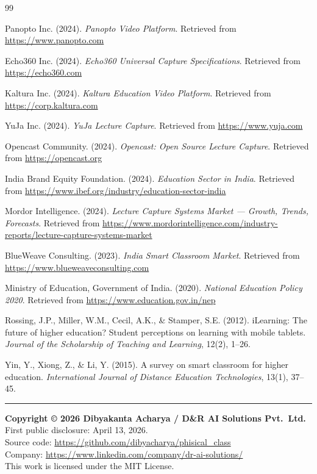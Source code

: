 \documentclass[12pt,a4paper]{article}
\begin{document}
\begin{thebibliography}{99}

Panopto Inc. (2024). \textit{Panopto Video Platform}. Retrieved from \url{https://www.panopto.com}

Echo360 Inc. (2024). \textit{Echo360 Universal Capture Specifications}. Retrieved from \url{https://echo360.com}

Kaltura Inc. (2024). \textit{Kaltura Education Video Platform}. Retrieved from \url{https://corp.kaltura.com}

YuJa Inc. (2024). \textit{YuJa Lecture Capture}. Retrieved from \url{https://www.yuja.com}

Opencast Community. (2024). \textit{Opencast: Open Source Lecture Capture}. Retrieved from \url{https://opencast.org}

India Brand Equity Foundation. (2024). \textit{Education Sector in India}. Retrieved from \url{https://www.ibef.org/industry/education-sector-india}

Mordor Intelligence. (2024). \textit{Lecture Capture Systems Market — Growth, Trends, Forecasts}. Retrieved from \url{https://www.mordorintelligence.com/industry-reports/lecture-capture-systems-market}

BlueWeave Consulting. (2023). \textit{India Smart Classroom Market}. Retrieved from \url{https://www.blueweaveconsulting.com}

Ministry of Education, Government of India. (2020). \textit{National Education Policy 2020}. Retrieved from \url{https://www.education.gov.in/nep}

Rossing, J.P., Miller, W.M., Cecil, A.K., \& Stamper, S.E. (2012). iLearning: The future of higher education? Student perceptions on learning with mobile tablets. \textit{Journal of the Scholarship of Teaching and Learning}, 12(2), 1--26.

Yin, Y., Xiong, Z., \& Li, Y. (2015). A survey on smart classroom for higher education. \textit{International Journal of Distance Education Technologies}, 13(1), 37--45.

\end{thebibliography}

\vspace{2em}
\hrule
\vspace{0.5em}

\begin{center}
\small
\textbf{Copyright \copyright{} 2026 Dibyakanta Acharya / D\&R AI Solutions Pvt.\ Ltd.}\\
First public disclosure: April 13, 2026.\\
Source code: \url{https://github.com/dibyacharya/phisical_class}\\
Company: \url{https://www.linkedin.com/company/dr-ai-solutions/}\\
This work is licensed under the MIT License.
\end{center}
\end{document}
